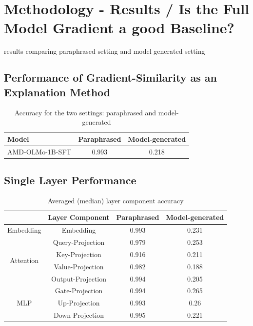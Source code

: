 \chapter{Methodology - Results / Is the Full Model Gradient a good Baseline?}
results comparing paraphrased setting and model generated setting


\section{Performance of Gradient-Similarity as an Explanation Method}
\begin{table}[htb]
    \centering
    \begin{tabular}{|l|c|c|}
        \hline
        \textbf{Model} & \textbf{Paraphrased} & \textbf{Model-generated} \\
        \hline
        AMD-OLMo-1B-SFT & 0.993 & 0.218 \\
        \hline
    \end{tabular}
    \caption{Accuracy for the two settings: paraphrased and model-generated}
    \label{tab:model_accuracy}
\end{table}

\section{Single Layer Performance}

\begin{table}[htb]
    \centering
    \begin{tabular}{|c|c|c|c|}
        \hline
        & \textbf{Layer Component} & \textbf{Paraphrased} & \textbf{Model-generated} \\
        \hline
        \multirow{1}{5em}{Embedding}
        & Embedding & 0.993 & 0.231 \\
        \hline
        \multirow{4}{5em}{Attention}
        & Query-Projection & 0.979 & 0.253 \\
        & Key-Projection & 0.916 & 0.211 \\
        & Value-Projection & 0.982 & 0.188 \\
        & Output-Projection & 0.994 & 0.205 \\
        \hline
        \multirow{3}{5em}{MLP}
        & Gate-Projection & 0.994 & 0.265 \\
        & Up-Projection & 0.993 & 0.26 \\
        & Down-Projection & 0.995 & 0.221 \\
        \hline
    \end{tabular}
    \caption{Averaged (median) layer component accuracy }
    \label{tab:average_accuracy_layer_component}
\end{table}

